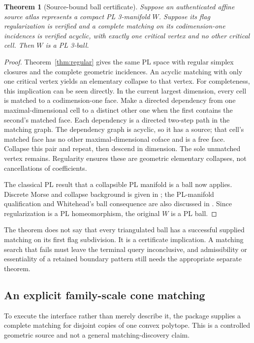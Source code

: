 \documentclass[11pt]{article}
\newtheorem{theorem}{Theorem}[section]
\theoremstyle{definition}\newtheorem{definition}[theorem]{Definition}
\theoremstyle{remark}\newtheorem{remark}[theorem]{Remark}
\begin{document}
\begin{theorem}[Source-bound ball certificate]\label{thm:ball}
Suppose an authenticated affine source atlas represents a compact PL 3-manifold \(W\). Suppose its flag regularization is verified and a complete matching on its codimension-one incidences is verified acyclic, with exactly one critical vertex and no other critical cell. Then \(W\) is a PL 3-ball.
\end{theorem}
\begin{proof}
Theorem~\ref{thm:regular} gives the same PL space with regular simplex closures and the complete geometric incidences. An acyclic matching with only one critical vertex yields an elementary collapse to that vertex. For completeness, this implication can be seen directly. In the current largest dimension, every cell is matched to a codimension-one face. Make a directed dependency from one maximal-dimensional cell to a distinct other one when the first contains the second's matched face. Each dependency is a directed two-step path in the matching graph. The dependency graph is acyclic, so it has a source; that cell's matched face has no other maximal-dimensional coface and is a free face. Collapse this pair and repeat, then descend in dimension. The sole unmatched vertex remains. Regularity ensures these are geometric elementary collapses, not cancellations of coefficients.

The classical PL result that a collapsible PL manifold is a ball now applies. Discrete Morse and collapse background is given in \cite{forman}; the PL-manifold qualification and Whitehead's ball consequence are also discussed in \cite{abl}. Since regularization is a PL homeomorphism, the original \(W\) is a PL ball.
\end{proof}

The theorem does not say that every triangulated ball has a successful supplied matching on its first flag subdivision. It is a certificate implication. A matching search that fails must leave the terminal query inconclusive, and admissibility or essentiality of a retained boundary pattern still needs the appropriate separate theorem.

\subsection{An explicit family-scale cone matching}
To execute the interface rather than merely describe it, the package supplies a complete matching for disjoint copies of one convex polytope. This is a controlled geometric source and not a general matching-discovery claim.
\end{document}
